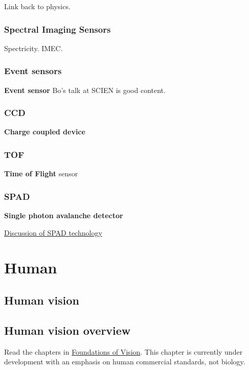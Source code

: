 \documentclass[
  letterpaper,
]{book}
\begin{document}
Link back to physics.

\section{Spectral Imaging Sensors}\label{sec-sensor-spectral}

Spectricity. IMEC.

\section{Event sensors}\label{sec-sensor-event}

\textbf{Event sensor} Bo's talk at SCIEN is good content.

\section{CCD}\label{sec-sensor-ccd}

\textbf{Charge coupled device}

\section{TOF}\label{sec-sensor-tof}

\textbf{Time of Flight} sensor

\section{SPAD}\label{sec-sensor-spad}

\textbf{Single photon avalanche detector}

\href{https://g.co/gemini/share/1618a5d47f5a}{Discussion of SPAD
technology}

\part{Human}

\chapter{Human vision}\label{sec-human}

\chapter{Human vision overview}\label{sec-human-overview}

Read the chapters in
\href{https://foundationsofvision.stanford.edu}{Foundations of Vision}.
This chapter is currently under development with an emphasis on human
commercial standards, not biology.
\end{document}
